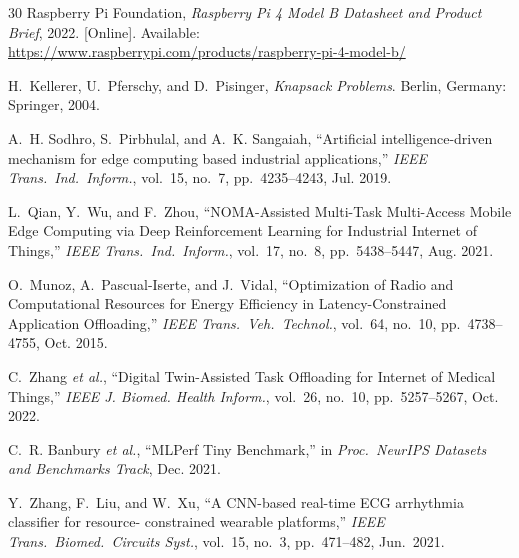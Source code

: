 \documentclass[journal]{IEEEtran}
\begin{document}
\begin{thebibliography}{30}
Raspberry Pi Foundation,
\emph{Raspberry Pi 4 Model B Datasheet and Product Brief},
2022.
[Online]. Available: \url{https://www.raspberrypi.com/products/raspberry-pi-4-model-b/}

H.~Kellerer, U.~Pferschy, and D.~Pisinger,
\emph{Knapsack Problems}.
Berlin, Germany: Springer, 2004.

A.~H. Sodhro, S.~Pirbhulal, and A.~K. Sangaiah,
``Artificial intelligence-driven mechanism for edge computing based
industrial applications,''
\emph{IEEE Trans.\ Ind.\ Inform.}, vol.~15, no.~7,
pp.~4235--4243, Jul. 2019.

L.~Qian, Y.~Wu, and F.~Zhou,
``NOMA-Assisted Multi-Task Multi-Access Mobile Edge Computing via
Deep Reinforcement Learning for Industrial Internet of Things,''
\emph{IEEE Trans.\ Ind.\ Inform.}, vol.~17, no.~8,
pp.~5438--5447, Aug. 2021.

O.~Munoz, A.~Pascual-Iserte, and J.~Vidal,
``Optimization of Radio and Computational Resources for Energy
Efficiency in Latency-Constrained Application Offloading,''
\emph{IEEE Trans.\ Veh.\ Technol.}, vol.~64, no.~10,
pp.~4738--4755, Oct. 2015.

C.~Zhang \emph{et al.},
``Digital Twin-Assisted Task Offloading for Internet of Medical
Things,''
\emph{IEEE J. Biomed. Health Inform.}, vol.~26, no.~10,
pp.~5257--5267, Oct. 2022.

C.~R. Banbury \emph{et al.},
``MLPerf Tiny Benchmark,''
in \emph{Proc.\ NeurIPS Datasets and Benchmarks Track}, Dec. 2021.

Y.~Zhang, F.~Liu, and W.~Xu,
``A CNN-based real-time ECG arrhythmia classifier for resource-
constrained wearable platforms,''
\emph{IEEE Trans.\ Biomed.\ Circuits Syst.}, vol.~15, no.~3,
pp.~471--482, Jun.\ 2021.

\end{thebibliography}
\end{document}
